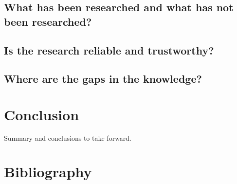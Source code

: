 \documentclass[a4paper, 11pt]{article}
\begin{document}
\subsection{What has been researched and what has not been researched?}


\subsection{Is the research reliable and trustworthy?}


\subsection{Where are the gaps in the knowledge?}

\section{Conclusion}
Summary and conclusions to take forward.

\section{Bibliography}


\end{document}
